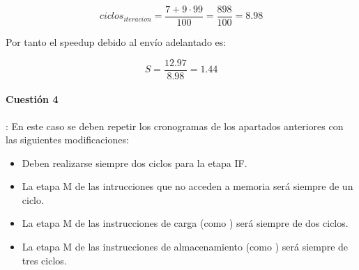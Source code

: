 \[
ciclos_{iteracion} = \frac{7 + 9 \cdot 99}{100} = \frac{898}{100} = 8.98
\]

Por tanto el speedup debido al envío adelantado es:

\[
S = \frac{12.97}{8.98} = 1.44
\]

\paragraph{Cuestión 4}: En este caso se deben repetir los cronogramas de los apartados anteriores
con las siguientes modificaciones:
\begin{itemize}
  \item Deben realizarse siempre dos ciclos para la etapa IF.
  \item La etapa M de las intrucciones que no acceden a memoria será siempre de un ciclo.
  \item La etapa M de las instrucciones de carga (como ) será siempre de dos ciclos.
  \item La etapa M de las instrucciones de almacenamiento (como ) será siempre de tres ciclos.
\end{itemize}
